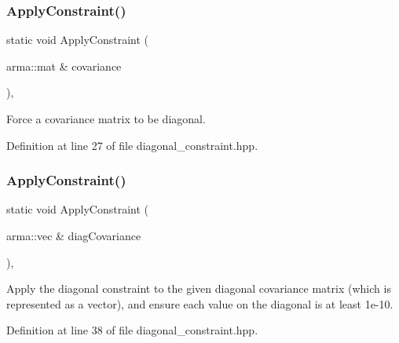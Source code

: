 \subsubsection{Apply\+Constraint()\hspace{0.1cm}{\footnotesize\ttfamily [1/2]}}
{\footnotesize\ttfamily static void Apply\+Constraint (\begin{DoxyParamCaption}\item[{arma\+::mat \&}]{covariance }\end{DoxyParamCaption})\hspace{0.3cm}{\ttfamily [inline]}, {\ttfamily [static]}}



Force a covariance matrix to be diagonal. 



Definition at line 27 of file diagonal\+\_\+constraint.\+hpp.

\mbox{\label{classmlpack_1_1gmm_1_1DiagonalConstraint_a5262e4a927a389167cfc7714de4df883}} 
\subsubsection{Apply\+Constraint()\hspace{0.1cm}{\footnotesize\ttfamily [2/2]}}
{\footnotesize\ttfamily static void Apply\+Constraint (\begin{DoxyParamCaption}\item[{arma\+::vec \&}]{diag\+Covariance }\end{DoxyParamCaption})\hspace{0.3cm}{\ttfamily [inline]}, {\ttfamily [static]}}



Apply the diagonal constraint to the given diagonal covariance matrix (which is represented as a vector), and ensure each value on the diagonal is at least 1e-\/10. 



Definition at line 38 of file diagonal\+\_\+constraint.\+hpp.

\mbox{\label{classmlpack_1_1gmm_1_1DiagonalConstraint_a408eb4ebf27591742383f36e84641a80}} 
